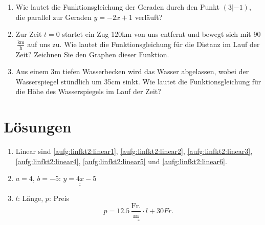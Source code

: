 \documentclass[%
11pt,%
twoside,%
titlepage,%
german,%
headsepline%
]{scrartcl}
\newcommand{\ufrac}[2]{\ensuremath{\,\frac{\mathrm{#1}}{\mathrm{#2}}}}
\newcommand{\result}[1]{\underline{\underline{#1}}}
\begin{document}
{{{\begin{enumerate}
\item Wie lautet die Funktionsgleichung der Geraden durch den Punkt $(3|-1)$, die parallel zur Geraden $y=-2x+1$ verl\"auft?


\item Zur Zeit $t=0$ startet ein Zug 120\unit{km} von uns entfernt und bewegt sich mit 90\ufrac{km}{h} auf uns zu. Wie lautet die Funktionsgleichung f\"ur die Distanz im Lauf der Zeit? Zeichnen Sie den Graphen dieser Funktion.

\item Aus einem 3\unit{m} tiefen Wasserbecken wird das Wasser abgelassen, wobei der Wasserspiegel st\"undlich um 35\unit{cm} sinkt. Wie lautet die Funktionsgleichung f\"ur die H\"ohe des Wasserspiegels im Lauf der Zeit?

\end{enumerate}}


\section*{L\"osungen}
{\settowidth{\labelwidth}{L19.19}
\setlength{\leftmargini}{\labelwidth} \addtolength{\leftmargini}{\labelsep}
\renewcommand{\labelenumi}{L\thesection.\arabic{enumi}}
\begin{enumerate}

\item Linear sind \ref{aufg:linfkt2:linear1}, \ref{aufg:linfkt2:linear2}, \ref{aufg:linfkt2:linear3}, \ref{aufg:linfkt2:linear4}, \ref{aufg:linfkt2:linear5} und \ref{aufg:linfkt2:linear6}.
\item $a=4$, $b=-5$: $\result{y=4x-5}$

\item $l$: L\"ange, $p$: Preis
  \begin{displaymath}
    \result{p=12.5\ufrac{Fr.}{m} \cdot l + 30\unit{Fr.}}
  \end{displaymath}


\end{enumerate}}}}
\end{document}
